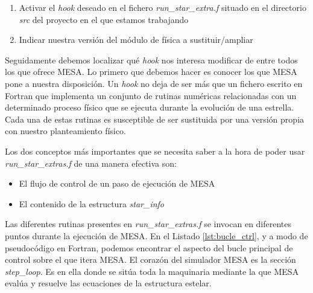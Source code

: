 \begin{enumerate}
    \item Activar el \textit{hook} deseado en el fichero \textit{run\_star\_extra.f} situado en el directorio \textit{src} del proyecto en el que estamos trabajando
    \item Indicar nuestra versión del módulo de física a sustituir/ampliar
\end{enumerate}

Seguidamente debemos localizar qué \textit{hook} nos interesa modificar de entre todos los que ofrece MESA. Lo primero que debemos hacer es conocer los que MESA pone a nuestra disposición. Un \textit{hook} no deja de ser más que un fichero escrito en Fortran que implementa un conjunto de rutinas numéricas relacionadas con un determinado proceso físico que se ejecuta durante la evolución de una estrella. Cada una de estas rutinas es susceptible de ser sustituida por una versión propia con nuestro planteamiento físico.\par

Los dos conceptos más importantes que se necesita saber a la hora de poder usar \textit{run\_star\_extras.f} de una manera efectiva son:
\begin{itemize}
    \item El flujo de control de un paso de ejecución de MESA
    \item El contenido de la estructura \textit{star\_info}
\end{itemize}

Las diferentes rutinas presentes en \textit{run\_star\_extras.f} se invocan en diferentes puntos durante la ejecución de MESA. En el Listado \ref{lst:bucle_ctrl}, y a modo de pseudo\-código en Fortran, podemos encontrar el aspecto del bucle principal de control sobre el que itera MESA. El corazón del simulador MESA es la sección \textit{step\_loop}. Es en ella donde se sitúa toda la maquinaria mediante la que MESA evalúa y resuelve las ecuaciones de la estructura estelar.\par

